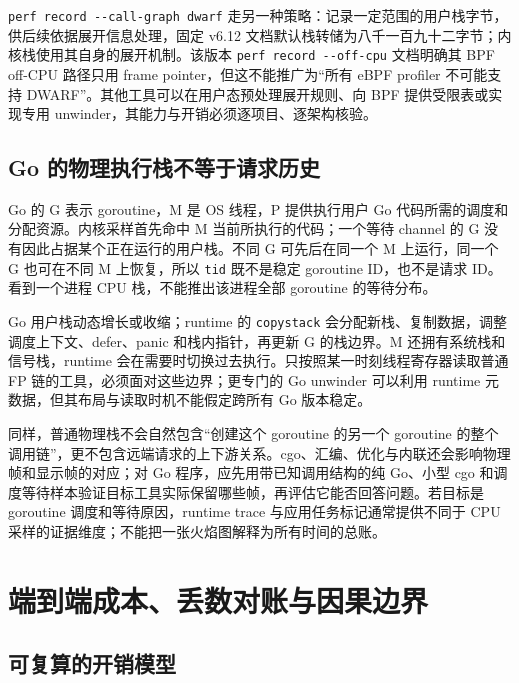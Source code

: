 \documentclass[UTF8,fontset=fandol,openany,11pt]{ctexbook}
\begin{document}
\texttt{perf record -\allowbreak{}-\allowbreak{}call-\allowbreak{}graph dwarf} 走另一种策略：记录一定范围的用户栈字节，供后续依据展开信息处理，固定 v6.12 文档默认栈转储为八千一百九十二字节；内核栈使用其自身的展开机制。该版本 \texttt{perf record -\allowbreak{}-\allowbreak{}off-\allowbreak{}cpu} 文档明确其 BPF off-CPU 路径只用 frame pointer，但这不能推广为“所有 eBPF profiler 不可能支持 DWARF”。其他工具可以在用户态预处理展开规则、向 BPF 提供受限表或实现专用 unwinder，其能力与开销必须逐项目、逐架构核验。\cite{eb-perf-record}\cite{eb-x86-callchain}


\subsection{Go 的物理执行栈不等于请求历史}

Go 的 G 表示 goroutine，M 是 OS 线程，P 提供执行用户 Go 代码所需的调度和分配资源。内核采样首先命中 M 当前所执行的代码；一个等待 channel 的 G 没有因此占据某个正在运行的用户栈。不同 G 可先后在同一个 M 上运行，同一个 G 也可在不同 M 上恢复，所以 \texttt{tid} 既不是稳定 goroutine ID，也不是请求 ID。看到一个进程 CPU 栈，不能推出该进程全部 goroutine 的等待分布。\cite{eb-go-runtime}


Go 用户栈动态增长或收缩；runtime 的 \texttt{copystack} 会分配新栈、复制数据，调整调度上下文、defer、panic 和栈内指针，再更新 G 的栈边界。M 还拥有系统栈和信号栈，runtime 会在需要时切换过去执行。只按照某一时刻线程寄存器读取普通 FP 链的工具，必须面对这些边界；更专门的 Go unwinder 可以利用 runtime 元数据，但其布局与读取时机不能假定跨所有 Go 版本稳定。\cite{eb-go-runtime}\cite{eb-go-stack}


同样，普通物理栈不会自然包含“创建这个 goroutine 的另一个 goroutine 的整个调用链”，更不包含远端请求的上下游关系。cgo、汇编、优化与内联还会影响物理帧和显示帧的对应；对 Go 程序，应先用带已知调用结构的纯 Go、小型 cgo 和调度等待样本验证目标工具实际保留哪些帧，再评估它能否回答问题。若目标是 goroutine 调度和等待原因，runtime trace 与应用任务标记通常提供不同于 CPU 采样的证据维度；不能把一张火焰图解释为所有时间的总账。\cite{eb-go-runtime}\cite{eb-go-stack}\cite{eb-perf-record}


\section{端到端成本、丢数对账与因果边界}

\subsection{可复算的开销模型}
\end{document}

